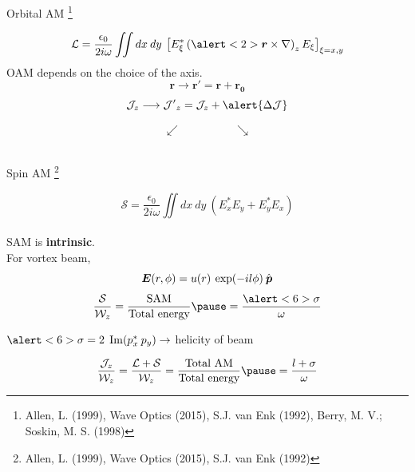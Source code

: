 \documentclass[12pt, dvipsnames]{beamer}
\numberwithin{equation}{section}
\newcommand\blfootnote[1]{%
	\begingroup
	\renewcommand\thefootnote{}\footnote{#1}%
	\addtocounter{footnote}{-1}%
	\endgroup
}
\begin{document}
\begin{frame}[t]{Orbital AM}\blfootnote{Allen, L. (1999), Wave Optics (2015), S.J. van Enk (1992), Berry, M. V.; Soskin, M. S. (1998)}%
	\vspace{-9pt}
	$$\mathcal{L}
	= \frac{\epsilon_0}{2i\omega} \iint dx\:dy\:\left[E_\xi^\ast\left(\alert<2>{\boldsymbol{r}}\times\nabla\right)_zE_\xi\right]_{\xi=x,y}$$\pause
	\alert<2>{OAM depends on the choice of the axis.}\pause
	$$\boldsymbol{r}\longrightarrow\boldsymbol{r'}=\boldsymbol{r}+\boldsymbol{r_0}$$\pause\vspace{-8mm}
	$$\mathcal{J}_z\longrightarrow\mathcal{J'}_z = \mathcal{J}_z + \alert{\Delta\mathcal{J}}$$\pause\vspace{-8mm}
	
	\begin{center}
		\vspace{-4mm}\pause
		$$\swarrow\hspace{2cm}\searrow$$\\\vspace{-2mm}\pause
		\hspace{1cm}
	\end{center}\pause

\end{frame}

\begin{frame}[t]{Spin AM}\blfootnote{Allen, L. (1999), Wave Optics (2015), S.J. van Enk (1992)}
	$$\mathcal{S}=\frac{\epsilon_0}{2i\omega}\iint dx\:dy\: (E_x^\ast E_y + E_y^\ast E_x)$$\\\pause
	\alert<2>{SAM is \textbf{intrinsic}}.\\\pause
	For vortex beam,
	$$\boldsymbol{E}(r,\phi)= u(r)\:\exp(-il\phi)\:\Hat{\boldsymbol{p}}$$\pause\vspace{-3mm}
	$$\frac{\mathcal{S}}{\mathcal{W}_z} =\frac{\text{SAM}}{\text{Total energy}} \pause = \frac{\alert<6>{\sigma}}{\omega} $$\pause
	
	$\alert<6>{\sigma=2\;\Im(p_x^\ast\: p_y)}\rightarrow$ helicity of beam\pause
	
	$$\frac{\mathcal{J}_z}{\mathcal{W}_z} = \frac{\mathcal{L}+\mathcal{S}}{\mathcal{W}_z} =\frac{\text{Total AM}}{\text{Total energy}} \pause=\frac{l+\sigma}{\omega}$$
\end{frame}
\end{document}
